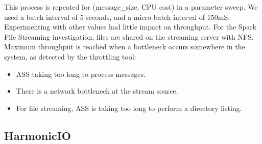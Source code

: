 \documentclass[conference]{IEEEtran}
\begin{document}
This process is repeated for (message\_size, CPU cost) in a parameter sweep. 
We used a batch interval of 5 seconds, and a micro-batch interval of 150mS. Experimenting with other values had little impact on throughput. For the Spark File Streaming investigation, files are shared on the streaming server with NFS. %
Maximum throughput is reached when a bottleneck occurs somewhere in the system, as detected by the throttling tool:
\begin{itemize}
\item ASS taking too long to process messages.%
\item There is a network bottleneck at the stream source.%
\item For file streaming, ASS is taking too long to perform a directory listing.%
\end{itemize}





\subsection{HarmonicIO}
\end{document}

